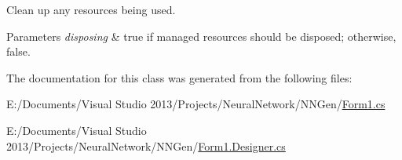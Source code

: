 Clean up any resources being used. 


\begin{DoxyParams}{Parameters}
{\em disposing} & true if managed resources should be disposed; otherwise, false.\\
\hline
\end{DoxyParams}


The documentation for this class was generated from the following files\+:\begin{DoxyCompactItemize}
\item 
E\+:/\+Documents/\+Visual Studio 2013/\+Projects/\+Neural\+Network/\+N\+N\+Gen/\hyperlink{_form1_8cs}{Form1.\+cs}\item 
E\+:/\+Documents/\+Visual Studio 2013/\+Projects/\+Neural\+Network/\+N\+N\+Gen/\hyperlink{_form1_8_designer_8cs}{Form1.\+Designer.\+cs}\end{DoxyCompactItemize}
